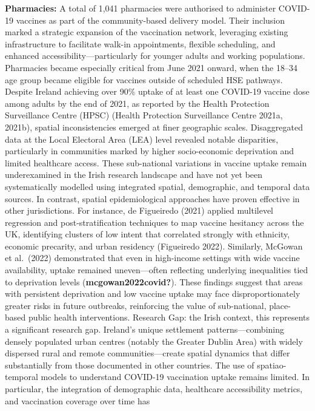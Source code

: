 \documentclass{article}
\begin{document}
\textbf{Pharmacies:} A total of 1,041 pharmacies were authorised to
administer COVID-19 vaccines as part of the community-based delivery
model. Their inclusion marked a strategic expansion of the vaccination
network, leveraging existing infrastructure to facilitate walk-in
appointments, flexible scheduling, and enhanced
accessibility---particularly for younger adults and working populations.
Pharmacies became especially critical from June 2021 onward, when the
18--34 age group became eligible for vaccines outside of scheduled HSE
pathways. Despite Ireland achieving over 90\% uptake of at least one
COVID-19 vaccine dose among adults by the end of 2021, as reported by
the Health Protection Surveillance Centre (HPSC) (Health Protection
Surveillance Centre 2021a, 2021b), spatial inconsistencies emerged at
finer geographic scales. Disaggregated data at the Local Electoral Area
(LEA) level revealed notable disparities, particularly in communities
marked by higher socio-economic deprivation and limited healthcare
access. These sub-national variations in vaccine uptake remain
underexamined in the Irish research landscape and have not yet been
systematically modelled using integrated spatial, demographic, and
temporal data sources. In contrast, spatial epidemiological approaches
have proven effective in other jurisdictions. For instance, de
Figueiredo (2021) applied multilevel regression and post-stratification
techniques to map vaccine hesitancy across the UK, identifying clusters
of low intent that correlated strongly with ethnicity, economic
precarity, and urban residency (Figueiredo 2022). Similarly, McGowan et
al.~(2022) demonstrated that even in high-income settings with wide
vaccine availability, uptake remained uneven---often reflecting
underlying inequalities tied to deprivation levels
(\textbf{mcgowan2022covid?}). These findings suggest that areas with
persistent deprivation and low vaccine uptake may face
disproportionately greater risks in future outbreaks, reinforcing the
value of sub-national, place-based public health interventions. Research
Gap: the Irish context, this represents a significant research gap.
Ireland's unique settlement patterns---combining densely populated urban
centres (notably the Greater Dublin Area) with widely dispersed rural
and remote communities---create spatial dynamics that differ
substantially from those documented in other countries. The use of
spatiao-temporal models to understand COVID-19 vaccination uptake
remains limited. In particular, the integration of demographic data,
healthcare accessibility metrics, and vaccination coverage over time has
\end{document}
